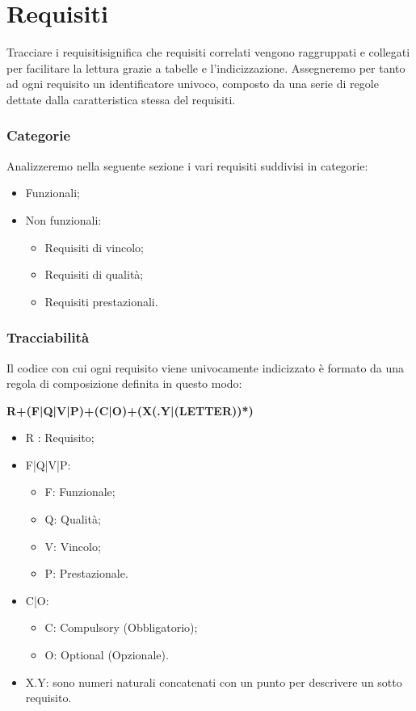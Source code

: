 
\section{Requisiti}
    Tracciare i requisiti\pedice significa che requisiti correlati vengono raggruppati e collegati per facilitare la lettura grazie a tabelle e l'indicizzazione.
    Assegneremo per tanto ad ogni requisito un identificatore univoco, composto da una serie di regole dettate dalla caratteristica stessa del requisiti.
    
    \subsubsection{Categorie}
    Analizzeremo nella seguente sezione i vari requisiti suddivisi in categorie:
    \begin{itemize}
        \item Funzionali;
        \item Non funzionali:
            \begin{itemize}
                \item Requisiti di vincolo;
                \item Requisiti di qualità;
                \item Requisiti prestazionali.
            \end{itemize}
    \end{itemize}
    
    \subsubsection{Tracciabilità}
    Il codice con cui ogni requisito viene univocamente indicizzato è formato da una regola di composizione definita in questo modo:
    \newline
    
    \begin{center}
        \textbf{R+(F|Q|V|P)+(C|O)+(X(.Y|(LETTER))*)}    
    \end{center}
    
    
    \begin{itemize}
        \item R : Requisito;
        \item F|Q|V|P:
            \begin{itemize}
                \item F: Funzionale;
                \item Q: Qualità;
                \item V: Vincolo;
                \item P: Prestazionale.
            \end{itemize}
        \item C|O:
            \begin{itemize}
                \item C: Compulsory (Obbligatorio);
                \item O: Optional (Opzionale).
            \end{itemize}
        \item X.Y: sono numeri naturali concatenati con un punto per descrivere un sotto requisito.
    \end{itemize}
    
